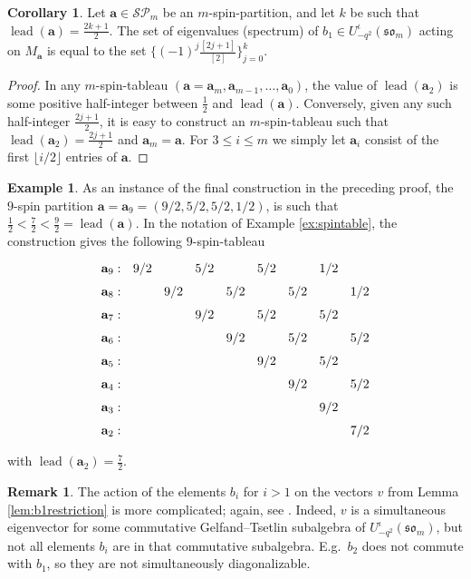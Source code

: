 \documentclass[10pt]{amsart}
\numberwithin{equation}{section}
\theoremstyle{definition}
\newtheorem{cor}[thm]{Corollary}
\newtheorem{rem}[thm]{Remark}
\newtheorem{example}[thm]{Example}
\newcommand{\som}[1][m]{\mathfrak{so}_{#1}}
\newcommand{\iqUsom}[1][m]{{U}^{\iota}_{-q^2}(\som[#1])}
\newcommand{\ab}{\mathbf{a}}
\DeclareMathOperator{\lead}{lead}
\newcommand{\SP}{\mathcal{SP}}
\begin{document}
\begin{cor}\label{cor:b1-spectrum}
Let $\ab\in \SP_m$ be an $m$-spin-partition, and let $k$ be such that $\lead(\ab) = \frac{2k+1}{2}$. 
The set of eigenvalues (spectrum) of $b_1 \in \iqUsom$ acting on $M_{\ab}$ is equal to the set $\{ (-1)^j \frac{[2j+1]}{[2]} \}_{j=0}^{k}$. 
\end{cor}
	
\begin{proof}
In any $m$-spin-tableau 
$(\ab=\ab_m,\ab_{m-1}, \ldots, \ab_0)$,
the value of $\lead(\ab_2)$ is some positive half-integer between $\frac{1}{2}$ and $\lead(\ab)$. 
Conversely, given any such half-integer $\frac{2j+1}{2}$, 
it is easy to construct an $m$-spin-tableau such that $\lead(\ab_2) = \frac{2j+1}{2}$ and $\ab_m =\ab$.
For $3 \leq i \leq m$ we simply let $\ab_i$ consist of the first $\lfloor i/2 \rfloor$ entries of $\ab$.
\end{proof}

\begin{example}
As an instance of the final construction in the preceding proof, 
the $9$-spin partition $\ab=\ab_9=(9/2, 5/2, 5/2, 1/2)$, 
is such that $\frac{1}{2}< \frac{7}{2} < \frac{9}{2} = \lead(\ab)$. 
In the notation of Example \ref{ex:spintable},
the construction gives the following $9$-spin-tableau 
\[
\begin{tikzcd}[column sep = 0.1 em, row sep =0.1 em]
\ab_9: & 9/2 & & 5/2 & & 5/2 & & 1/2 &  \\
\ab_8: &  & 9/2 & & 5/2 & & 5/2 & & 1/2 \\
\ab_7: &  & & 9/2 & & 5/2 & & 5/2 &  \\
\ab_6: &  & & & 9/2 & & 5/2 & & 5/2 \\
\ab_5: &  & & & & 9/2 & & 5/2 &  \\
\ab_4: &  & & & & & 9/2 & & 5/2 \\
\ab_3: &  & & & & & & 9/2 &  \\
\ab_2: &  & & & & & & & 7/2 \\
	\end{tikzcd}
	\]
with $\lead(\ab_2)=\frac{7}{2}$.
\end{example}

\begin{rem} 
The action of the elements $b_i$ for $i > 1$ on the vectors $v$ from Lemma \ref{lem:b1restriction} 
is more complicated; again, see \cite[equations (14) and (15)]{MR2143754}. 
Indeed, $v$ is a simultaneous eigenvector for 
some commutative Gelfand--Tsetlin subalgebra of $\iqUsom$, 
but not all elements $b_i$ are in that commutative subalgebra. 
E.g.~$b_2$ does not commute with $b_1$, 
so they are not simultaneously diagonalizable.
\end{rem}
\end{document}

